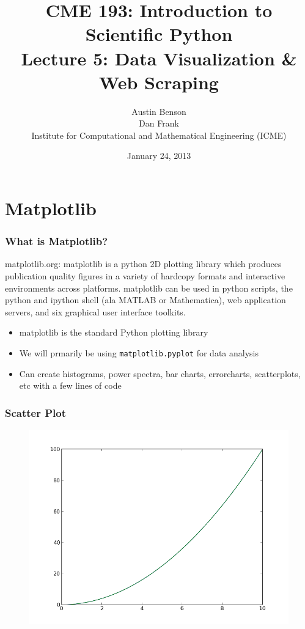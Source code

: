 \documentclass{beamer}
\title{CME 193: Introduction to Scientific Python \\
Lecture 5: Data Visualization \& Web Scraping}
\author{Austin Benson \\
\vspace{0.1in}
Dan Frank \\
\vspace{0.1in}
Institute for Computational and Mathematical Engineering (ICME)}
\date{January 24, 2013}
\begin{document}
\maketitle

\section{Matplotlib}

\begin{frame}
\frametitle{What is Matplotlib?}

matplotlib.org: matplotlib is a python 2D plotting library which produces publication quality figures in a variety of hardcopy formats and interactive environments across platforms. matplotlib can be used in python scripts, the python and ipython shell (ala MATLAB or Mathematica), web application servers, and six graphical user interface toolkits.

\begin{itemize}
\setlength{\itemsep}{0.1in}
\item{matplotlib is the standard Python plotting library}
\item{We will prmarily be using \texttt{matplotlib.pyplot} for data analysis}
\item{Can create histograms, power spectra, bar charts, errorcharts, scatterplots, etc with a few lines of code}
\end{itemize}
\end{frame}

\begin{frame}
\frametitle{Scatter Plot}
\lstset{basicstyle=\scriptsize}
\begin{figure}[h]
\includegraphics[width=.6\textwidth]{images/line_plot.png}
\end{figure}
\end{frame}
\end{document}

